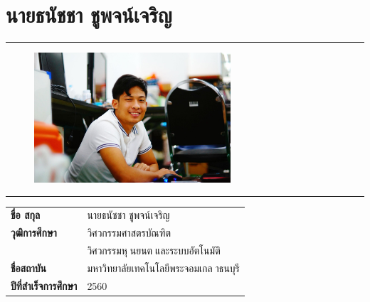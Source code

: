 \section*{นายธนัชชา ชูพจน์เจริญ}
\hrule height .7pt
\begin{figure}[!ht]
	\centering
	\includegraphics[width=0.65\textwidth]{pages/images/wuttipat.jpg}
\end{figure}
\hrule height .7pt
\raggedright
\begin{tabular}{p{} p{}}
    \textbf{ชื่อ สกุล} & {นายธนัชชา ชูพจน์เจริญ} \\
    \textbf{วุฒิการศึกษา} & {วิศวกรรมศาสตรบัณฑิต} \\
    {} & {วิศวกรรมหุนยนตและระบบอัตโนมัติ}\\
    \textbf{ชื่อสถาบัน} & {มหาวิทยาลัยเทคโนโลยีพระจอมเกลาธนบุรี} \\
    \textbf{ปีที่สำเร็จการศึกษา} & {2560} \\
\end{tabular}   